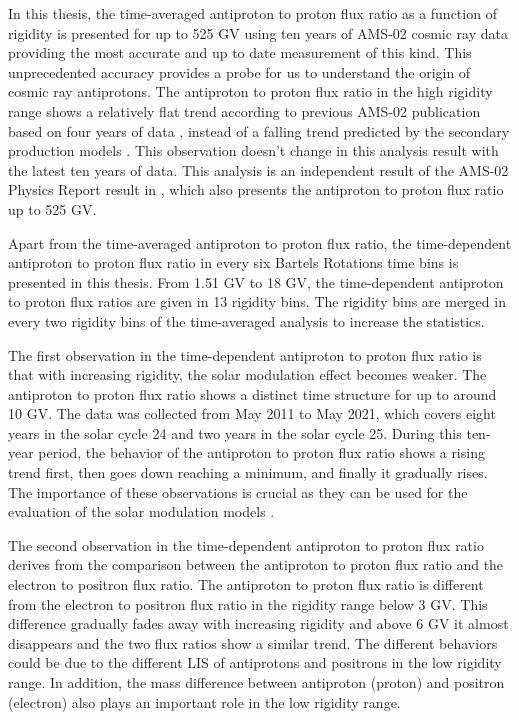 


In this thesis, the time-averaged antiproton to proton flux ratio as a function of rigidity is presented for up to 525 GV using ten years of AMS-02 cosmic ray data providing the most accurate and up to date measurement of this kind. This unprecedented accuracy provides a probe for us to understand the origin of cosmic ray antiprotons. The antiproton to proton flux ratio in the high rigidity range shows a relatively flat trend according to previous AMS-02 publication based on four years of data \cite{AMS02AntiprotonPRL2016}, instead of a falling trend predicted by the secondary production models \cite{TimeAveragedPbarRatioPaperSecondaryProduction1, TimeAveragedPbarRatioPaperSecondaryProduction2}. This observation doesn't change in this analysis result with the latest ten years of data. This analysis is an independent result of the AMS-02 Physics Report result in \cite{PhysicsReport2}, which also presents the antiproton to proton flux ratio up to 525 GV. 

Apart from the time-averaged antiproton to proton flux ratio, the time-dependent antiproton to proton flux ratio in every six Bartels Rotations time bins is presented in this thesis. From 1.51 GV to 18 GV, the time-dependent antiproton to proton flux ratios are given in 13 rigidity bins. The rigidity bins are merged in every two rigidity bins of the time-averaged analysis to increase the statistics. \par

The first observation in the time-dependent antiproton to proton flux ratio is that with increasing rigidity, the solar modulation effect becomes weaker. The antiproton to proton flux ratio shows a distinct time structure for up to around 10 GV. The data was collected from May 2011 to May 2021, which covers eight years in the solar cycle 24 and two years in the solar cycle 25. During this ten-year period, the behavior of the antiproton to proton flux ratio shows a rising trend first, then goes down reaching a minimum, and finally it gradually rises. The importance of these observations is crucial as they can be used for the evaluation of the solar modulation models \cite{TimeDependentPbarRatioModelPaper, AslamModulationPaper}. 

The second observation in the time-dependent antiproton to proton flux ratio derives from the comparison between the antiproton to proton flux ratio and the electron to positron flux ratio. The antiproton to proton flux ratio is different from the electron to positron flux ratio in the rigidity range below 3 GV. This difference gradually fades away with increasing rigidity and above 6 GV it almost disappears and the two flux ratios show a similar trend. The different behaviors could be due to the different LIS of antiprotons and positrons in the low rigidity range. In addition, the mass difference between antiproton (proton) and positron (electron) also plays an important role in the low rigidity range.      

